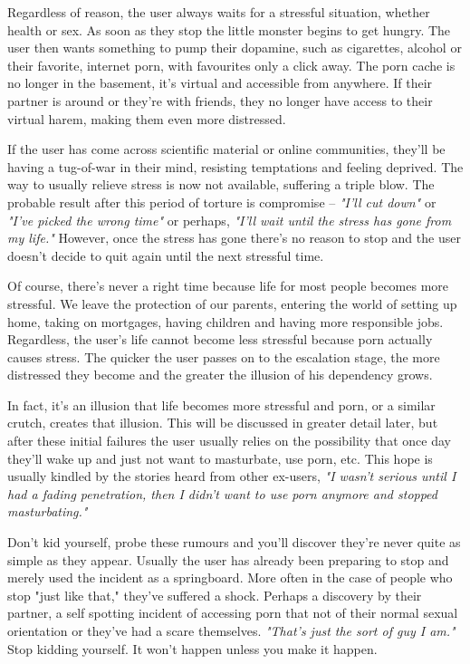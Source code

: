 \documentclass[easypeasy.tex]{subfiles}
\begin{document}
Regardless of reason, the user always waits for a stressful situation, whether health or sex. As soon as they stop the little monster begins to get hungry. The user then wants something to pump their dopamine, such as cigarettes, alcohol or their favorite, internet porn, with favourites only a click away. The porn cache is no longer in the basement, it's virtual and accessible from anywhere. If their partner is around or they're with friends, they no longer have access to their virtual harem, making them even more distressed.

If the user has come across scientific material or online communities, they'll be having a tug-of-war in their mind, resisting temptations and feeling deprived. The way to usually relieve stress is now not available, suffering a triple blow. The probable result after this period of torture is compromise -- \textit{"I'll cut down"} or \textit{"I've picked the wrong time"} or perhaps, \textit{"I'll wait until the stress has gone from my life."} However, once the stress has gone there's no reason to stop and the user doesn't decide to quit again until the next stressful time.

Of course, there's never a right time because life for most people becomes more stressful. We leave the protection of our parents, entering the world of setting up home, taking on mortgages, having children and having more responsible jobs. Regardless, the user's life cannot become less stressful because porn actually causes stress. The quicker the user passes on to the escalation stage, the more distressed they become and the greater the illusion of his dependency grows.

In fact, it's an illusion that life becomes more stressful and porn, or a similar crutch, creates that illusion. This will be discussed in greater detail later, but after these initial failures the user usually relies on the possibility that once day they'll wake up and just not want to masturbate, use porn, etc. This hope is usually kindled by the stories heard from other ex-users, \textit{"I wasn't serious until I had a fading penetration, then I didn't want to use porn anymore and stopped masturbating."}

Don't kid yourself, probe these rumours and you'll discover they're never quite as simple as they appear. Usually the user has already been preparing to stop and merely used the incident as a springboard. More often in the case of people who stop "just like that," they've suffered a shock. Perhaps a discovery by their partner, a self spotting incident of accessing porn that not of their normal sexual orientation or they've had a scare themselves. \textit{"That's just the sort of guy I am."} Stop kidding yourself. It won't happen unless you make it happen.
\end{document}
